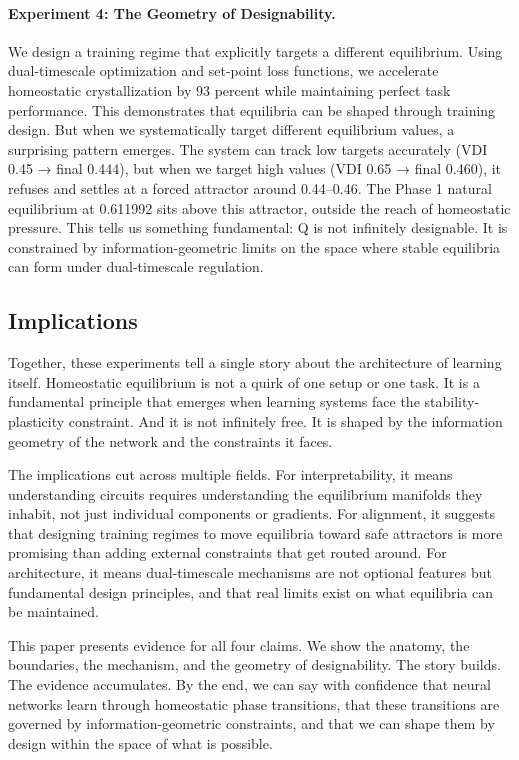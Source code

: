 \paragraph{Experiment 4: The Geometry of Designability.}
We design a training regime that explicitly targets a different equilibrium. Using dual-timescale optimization and set-point loss functions, we accelerate homeostatic crystallization by 93 percent while maintaining perfect task performance. This demonstrates that equilibria can be shaped through training design. But when we systematically target different equilibrium values, a surprising pattern emerges. The system can track low targets accurately (VDI 0.45 → final 0.444), but when we target high values (VDI 0.65 → final 0.460), it refuses and settles at a forced attractor around 0.44--0.46. The Phase 1 natural equilibrium at 0.611992 sits above this attractor, outside the reach of homeostatic pressure. This tells us something fundamental: Q is not infinitely designable. It is constrained by information-geometric limits on the space where stable equilibria can form under dual-timescale regulation.

\subsection{Implications}

Together, these experiments tell a single story about the architecture of learning itself. Homeostatic equilibrium is not a quirk of one setup or one task. It is a fundamental principle that emerges when learning systems face the stability-plasticity constraint. And it is not infinitely free. It is shaped by the information geometry of the network and the constraints it faces.

The implications cut across multiple fields. For interpretability, it means understanding circuits requires understanding the equilibrium manifolds they inhabit, not just individual components or gradients. For alignment, it suggests that designing training regimes to move equilibria toward safe attractors is more promising than adding external constraints that get routed around. For architecture, it means dual-timescale mechanisms are not optional features but fundamental design principles, and that real limits exist on what equilibria can be maintained.

This paper presents evidence for all four claims. We show the anatomy, the boundaries, the mechanism, and the geometry of designability. The story builds. The evidence accumulates. By the end, we can say with confidence that neural networks learn through homeostatic phase transitions, that these transitions are governed by information-geometric constraints, and that we can shape them by design within the space of what is possible.

